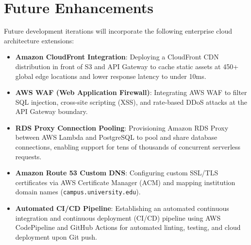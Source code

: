 \section{Future Enhancements}
Future development iterations will incorporate the following enterprise cloud architecture extensions:
\begin{itemize}
    \item \textbf{Amazon CloudFront Integration}: Deploying a CloudFront CDN distribution in front of S3 and API Gateway to cache static assets at 450+ global edge locations and lower response latency to under 10ms.
    \item \textbf{AWS WAF (Web Application Firewall)}: Integrating AWS WAF to filter SQL injection, cross-site scripting (XSS), and rate-based DDoS attacks at the API Gateway boundary.
    \item \textbf{RDS Proxy Connection Pooling}: Provisioning Amazon RDS Proxy between AWS Lambda and PostgreSQL to pool and share database connections, enabling support for tens of thousands of concurrent serverless requests.
    \item \textbf{Amazon Route 53 Custom DNS}: Configuring custom SSL/TLS certificates via AWS Certificate Manager (ACM) and mapping institution domain names (\texttt{campus.university.edu}).
    \item \textbf{Automated CI/CD Pipeline}: Establishing an automated continuous integration and continuous deployment (CI/CD) pipeline using AWS CodePipeline and GitHub Actions for automated linting, testing, and cloud deployment upon Git push.
\end{itemize}
